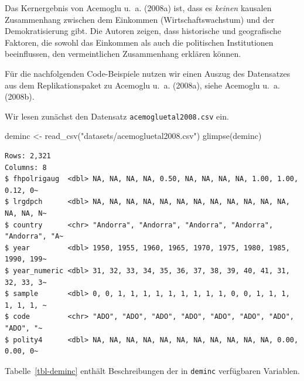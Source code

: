 \documentclass[
  a4paper,
  DIV=11,
  oneside]{scrreprt}
\newenvironment{Shaded}{\begin{snugshade}}{\end{snugshade}}
\newcommand{\FunctionTok}[1]{\textcolor[rgb]{0.28,0.35,0.67}{#1}}
\newcommand{\NormalTok}[1]{\textcolor[rgb]{0.00,0.23,0.31}{#1}}
\newcommand{\OtherTok}[1]{\textcolor[rgb]{0.00,0.23,0.31}{#1}}
\newcommand{\StringTok}[1]{\textcolor[rgb]{0.13,0.47,0.30}{#1}}
\begin{document}
Das Kernergebnis von Acemoglu u.~a. (2008a) ist, dass es \emph{keinen}
kausalen Zusammenhang zwischen dem Einkommen (Wirtschaftswachstum) und
der Demokratisierung gibt. Die Autoren zeigen, dass historische und
geografische Faktoren, die sowohl das Einkommen als auch die politischen
Institutionen beeinflussen, den vermeintlichen Zusammenhang erklären
können.

Für die nachfolgenden Code-Beispiele nutzen wir einen Auszug des
Datensatzes aus dem Replikationspaket zu Acemoglu u.~a. (2008a), siehe
Acemoglu u.~a. (2008b).

Wir lesen zunächst den Datensatz \texttt{acemogluetal2008.csv} ein.

\begin{Shaded}
\begin{Highlighting}[]
\NormalTok{deminc }\OtherTok{\textless{}{-}} \FunctionTok{read\_csv}\NormalTok{(}\StringTok{"datasets/acemogluetal2008.csv"}\NormalTok{)}
\FunctionTok{glimpse}\NormalTok{(deminc)}
\end{Highlighting}
\end{Shaded}

\begin{verbatim}
Rows: 2,321
Columns: 8
$ fhpolrigaug  <dbl> NA, NA, NA, NA, 0.50, NA, NA, NA, NA, 1.00, 1.00, 0.12, 0~
$ lrgdpch      <dbl> NA, NA, NA, NA, NA, NA, NA, NA, NA, NA, NA, NA, NA, NA, N~
$ country      <chr> "Andorra", "Andorra", "Andorra", "Andorra", "Andorra", "A~
$ year         <dbl> 1950, 1955, 1960, 1965, 1970, 1975, 1980, 1985, 1990, 199~
$ year_numeric <dbl> 31, 32, 33, 34, 35, 36, 37, 38, 39, 40, 41, 31, 32, 33, 3~
$ sample       <dbl> 0, 0, 1, 1, 1, 1, 1, 1, 1, 1, 1, 0, 0, 1, 1, 1, 1, 1, 1, ~
$ code         <chr> "ADO", "ADO", "ADO", "ADO", "ADO", "ADO", "ADO", "ADO", "~
$ polity4      <dbl> NA, NA, NA, NA, NA, NA, NA, NA, NA, NA, NA, 0.00, 0.00, 0~
\end{verbatim}

Tabelle~\ref{tbl-deminc} enthält Beschreibungen der in \texttt{deminc}
verfügbaren Variablen.
\end{document}
